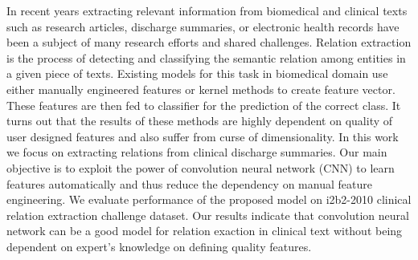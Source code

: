In recent years extracting relevant information from biomedical and clinical texts such as research articles, discharge summaries, or electronic health records have been a subject of many research efforts and shared challenges. Relation extraction is the process of detecting and classifying the semantic relation among entities in a given piece of texts. Existing models for this task in biomedical domain use either manually engineered features or kernel methods to create feature vector. These features are then fed to classifier for the prediction of the correct class. It turns out that the results of these methods are highly dependent on quality of user designed features and also suffer from curse of dimensionality. In this work we focus on extracting relations from clinical discharge summaries. Our main objective is to exploit the power of convolution neural network (CNN) to learn features automatically and thus reduce the dependency on manual feature engineering. We evaluate performance of the proposed model on i2b2-2010 clinical relation extraction challenge dataset. Our results indicate that convolution neural network can be a good model for relation exaction in clinical text without being dependent on expert's knowledge on defining quality features.
